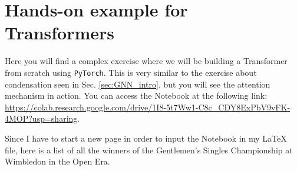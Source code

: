 \section{Hands-on example for Transformers}

Here you will find a complex exercise where we will be building a Transformer from scratch using \texttt{PyTorch}. This is very similar to the exercise about condensation seen in Sec. \ref{sec:GNN_intro}, but you will see the attention mechanism in action. You can access the Notebook at the following link: \url{https://colab.research.google.com/drive/1I8-5t7Ww1-C8c_CDY8ExPbV9vFK-4MOP?usp=sharing}.

Since I have to start a new page in order to input the Notebook in my LaTeX file, here is a list of all the winners of the Gentlemen's Singles Championship at Wimbledon in the Open Era. 

\vspace{5mm}

